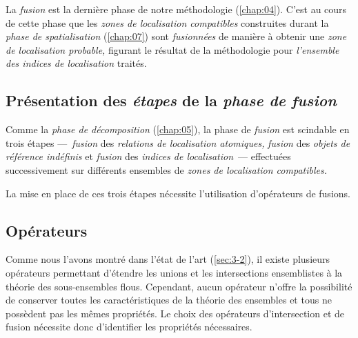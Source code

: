 La \emph{fusion} est la dernière phase de notre méthodologie
(\autoref{chap:04}). C'est au cours de cette phase que les \emph{zones
  de localisation compatibles} construites durant la \emph{phase de
  spatialisation} (\autoref{chap:07}) sont \emph{fusionnées} de
manière à obtenir une \emph{zone de localisation probable,} figurant
le résultat de la méthodologie pour \emph{l'ensemble des indices de
  localisation} traités.

\subsection{Présentation des \emph{étapes} de la \emph{phase de
    fusion}}

Comme la \emph{phase de décomposition} (\autoref{chap:05}), la phase
de \emph{fusion} est scindable en trois étapes ---~\emph{fusion} des
\emph{relations de localisation atomiques,} \emph{fusion} des
\emph{objets de référence indéfinis} et \emph{fusion} des
\emph{indices de localisation}~--- effectuées successivement sur
différents ensembles de \emph{zones de localisation compatibles.}




La mise en place de ces trois étapes nécessite l'utilisation
d'opérateurs de fusions.


\subsection{Opérateurs}

Comme nous l'avons montré dans l'état de l'art (\autoref{sec:3-2}), il
existe plusieurs opérateurs permettant d'étendre les unions et les
intersections ensemblistes à la théorie des sous-ensembles
flous. Cependant, aucun opérateur n'offre la possibilité de conserver
toutes les caractéristiques de la théorie des ensembles et tous
ne possèdent pas les mêmes propriétés. Le choix des opérateurs
d'intersection et de fusion nécessite donc d'identifier les
propriétés nécessaires.





